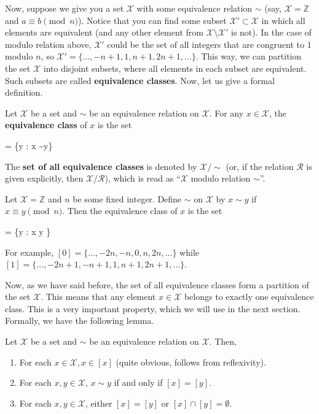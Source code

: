 \documentclass[../../book.tex]{subfiles}
\begin{document}
Now, suppose we give you a set $\mathcal{X}$ with some equivalence relation $\sim$ (say, $\mathcal{X} = \mathbb{Z}$ and $a \equiv b \pmod{n}$). Notice that you can find some subset $\mathcal{X}' \subset \mathcal{X}$ in which all elements are equivalent (and any other element from $\mathcal{X} \setminus \mathcal{X}'$ is not). In the case of modulo relation above, $\mathcal{X}'$ could be the set of all integers that are congruent to $1$ modulo $n$, so $\mathcal{X}' = \{\dots,-n+1,1,n+1,2n+1,\dots\}$. This way, we can partition the set $\mathcal{X}$ into disjoint subsets, where all elements in each subset are equivalent. Such subsets are called \textbf{equivalence classes}. Now, let us give a formal definition.

\begin{definition}
    Let $\mathcal{X}$ be a set and $\sim$ be an equivalence relation on $\mathcal{X}$. For any $x \in \mathcal{X}$, the \textbf{equivalence class} of $x$ is the set
    \begin{xequation*}
        [x] = \{y \in {}: x \sim y\}
    \end{xequation*}
    The \textbf{set of all equivalence classes} is denoted by $\mathcal{X}/\text{$\sim$}$ (or, if the relation $\mathcal{R}$ is given explicitly, then $\mathcal{X}/\mathcal{R}$), which is read as ``$\mathcal{X}$ modulo relation $\sim$''.
\end{definition}

\begin{example}
    Let $\mathcal{X} = \mathbb{Z}$ and $n$ be some fixed integer. Define $\sim$ on $\mathcal{X}$ by $x \sim y$ if $x \equiv y \pmod{n}$. Then the equivalence class of $x$ is the set
    \begin{xequation*}
        [x] = \{y \in {}: x \equiv y \}
    \end{xequation*}
    For example, $[0] = \{\ldots,-2n,-n,0,n,2n,\ldots\}$ while $[1] = \{\ldots,-2n+1,-n+1,1,n+1,2n+1,\ldots\}$.
\end{example}

Now, as we have said before, the set of all equivalence classes form a partition of the set $\mathcal{X}$. This means that any element $x \in \mathcal{X}$ belongs to exactly one equivalence class. This is a very important property, which we will use in the next section. Formally, we have the following lemma.
\begin{lemma}
    Let $\mathcal{X}$ be a set and $\sim$ be an equivalence relation on $\mathcal{X}$. Then,
    \begin{enumerate}
        \item For each $x \in \mathcal{X}, x \in [x]$ (quite obvious, follows from reflexivity).
        \item For each $x,y \in \mathcal{X}$, $x \sim y$ if and only if $[x] = [y]$.
        \item For each $x,y \in \mathcal{X}$, either $[x]=[y]$ or $[x] \cap [y] = \emptyset$.
    \end{enumerate}
\end{lemma}
\end{document}

